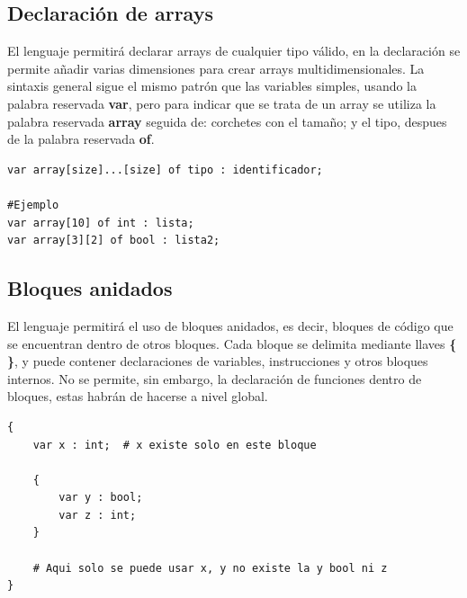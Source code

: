 \documentclass[12pt,a4paper]{article}
\begin{document}
\subsection{Declaración de arrays}
El lenguaje permitirá declarar arrays de cualquier tipo válido, en la declaración se permite añadir varias dimensiones para crear arrays multidimensionales.
La sintaxis general sigue el mismo patrón que las variables simples, usando la palabra reservada \textbf{var}, pero para  indicar que se trata de un array se utiliza la palabra reservada \textbf{array} seguida de: corchetes con el tamaño; y el tipo, despues de la palabra reservada \textbf{of}.

\begin{lstlisting}
var array[size]...[size] of tipo : identificador;

#Ejemplo
var array[10] of int : lista;
var array[3][2] of bool : lista2;
\end{lstlisting}





\subsection{Bloques anidados}

El lenguaje permitirá el uso de bloques anidados, es decir, bloques de código que se encuentran dentro de otros bloques.  
Cada bloque se delimita mediante llaves \textbf{\{ \}}, y puede contener declaraciones de variables, instrucciones y otros bloques internos. No se permite, sin embargo, la declaración de funciones dentro de bloques, estas habrán de hacerse a nivel global.  

\begin{lstlisting}
{
    var x : int;  # x existe solo en este bloque

    {
        var y : bool;  
        var z : int;
    }

    # Aqui solo se puede usar x, y no existe la y bool ni z
}
\end{lstlisting}
\end{document}
